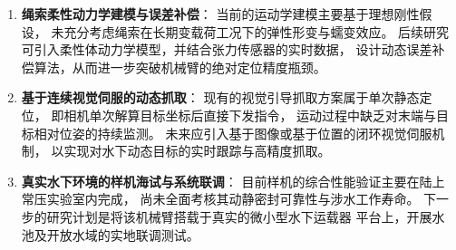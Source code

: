\begin{enumerate}
    \item \textbf{绳索柔性动力学建模与误差补偿}：
    当前的运动学建模主要基于理想刚性假设，
    未充分考虑绳索在长期变载荷工况下的弹性形变与蠕变效应。
    后续研究可引入柔性体动力学模型，并结合张力传感器的实时数据，
    设计动态误差补偿算法，从而进一步突破机械臂的绝对定位精度瓶颈。
    
    \item \textbf{基于连续视觉伺服的动态抓取}：
    现有的视觉引导抓取方案属于单次静态定位，
    即相机单次解算目标坐标后直接下发指令，
    运动过程中缺乏对末端与目标相对位姿的持续监测。
    未来应引入基于图像或基于位置的闭环视觉伺服机制，
    以实现对水下动态目标的实时跟踪与高精度抓取。
    
    
    \item \textbf{真实水下环境的样机海试与系统联调}：
    目前样机的综合性能验证主要在陆上常压实验室内完成，
    尚未全面考核其动静密封可靠性与涉水工作寿命。
    下一步的研究计划是将该机械臂搭载于真实的微小型水下运载器
    平台上，开展水池及开放水域的实地联调测试。
\end{enumerate}